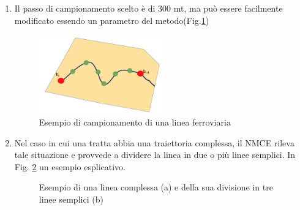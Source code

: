 \begin{enumerate}
\item Il passo di campionamento scelto è di 300 mt, ma può essere facilmente modificato essendo un parametro del metodo(Fig.\ref{puntiLinea})
\begin{figure}[bth]
	\centering
	\includegraphics[width=0.5\textwidth]{img/puntiLinea}
	\caption{Esempio di campionamento di una linea ferroviaria } 
	\label{puntiLinea}
\end{figure}

\item Nel caso in cui una tratta abbia una traiettoria complessa, il NMCE rileva tale situazione e provvede a dividere la linea in due o più linee semplici. In Fig. \ref{fig:divisioneLinea} un esempio esplicativo.

\begin{figure}[bth]
\myfloatalign
{} \quad
{} 
\caption[dove]{Esempio di una linea complessa (a) e della sua divisione in tre linee semplici (b)}
\label{fig:divisioneLinea}
\end{figure}



\end{enumerate}
